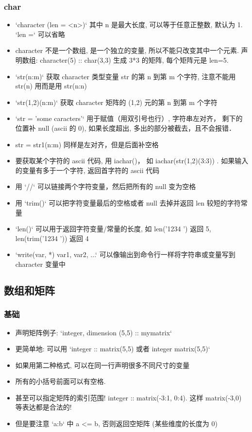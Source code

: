 \subsubsection{char}
\begin{itemize}
\item `character (len = <n>)` 其中 n 是最大长度, 可以等于任意正整数, 默认为 1.  `len =` 可以省略
\item character 不是一个数组, 是一个独立的变量, 所以不能只改变其中一个元素. 声明数组: character(5) :: char(3,3) 生成 3*3 的矩阵, 每个矩阵元是 len=5.
\item `str(n:m)` 获取 character 类型变量 str 的第 n 到第 m 个字符, 注意不能用 str(n) 用而是用 str(n:n)
\item `str(1,2)(n:m)` 获取 character 矩阵的 (1,2) 元的第 n 到第 m 个字符
\item `str = 'some caracters'` 用于赋值（用双引号也行）, 字符串左对齐， 剩下的位置补 null (ascii 的 0), 如果长度超出, 多出的部分被截去，且不会报错．
\item str = str1(n:m) 同样是左对齐，但是后面补空格
\item 要获取某个字符的 ascii 代码, 用 iachar()， 如 iachar(str(1,2)(3:3)) . 如果输入的变量有多于一个字符, 返回首字符的 ascii 代码
\item 用 `//` 可以链接两个字符变量，然后把所有的 null 变为空格
\item 用 `trim()` 可以把字符变量最后的空格或者 null 去掉并返回 len 较短的字符常量
\item `len()` 可以用于返回字符变量/常量的长度, 如 len('1234 ') 返回 5, len(trim('1234 ')) 返回 4
\item `write(var, *) var1, var2, ...` 可以像输出到命令行一样将字符串或变量写到 character 变量中
\end{itemize}

\subsection{数组和矩阵}
\subsubsection{基础}
\begin{itemize}
\item 声明矩阵例子:  `integer, dimension (5,5) :: mymatrix`
\item 更简单地: 可以用 `integer :: matrix(5,5)  或者 integer matrix(5,5)`
\item 如果用第二种格式, 可以在同一行声明很多不同尺寸的变量
\item 所有的小括号前面可以有空格.
\item 甚至可以指定矩阵的索引范围!   integer :: matrix(-3:1, 0:4). 这样 matrix(-3,0) 等表达都是合法的!
\item 但是要注意 `a:b` 中 a <= b, 否则返回空矩阵 (某些维度的长度为 0)
\end{itemize}

